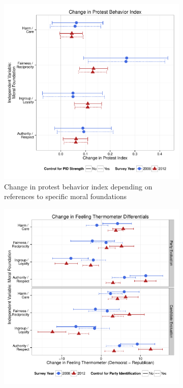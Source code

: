 \documentclass[12pt]{article}
\begin{document}
\begin{figure}[h]
\begin{subfigure}[t]{0.49\textwidth}
    \includegraphics[scale=.35]{../calc/fig/appD10part.pdf}
    \caption{Change in protest behavior index depending on references to specific moral foundations}\label{fig:appD10part}
  \end{subfigure}
  \begin{subfigure}[t]{0.49\textwidth}
    \includegraphics[scale=.35]{../calc/fig/appD11feel.pdf}

\end{subfigure}
\end{figure}
\end{document}
